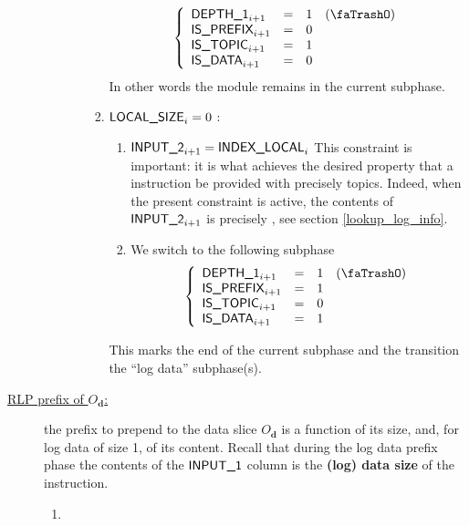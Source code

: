 \begin{description}
\begin{enumerate}[resume]
\begin{enumerate}
\begin{enumerate}
								\[
									\left\{ \begin{array}{lclr}
										\Depth 1_{i + 1}   & = & 1 & (\trash) \\
										\isprefix_{i + 1}  & = & 0 &          \\
										\isOt_{i + 1}      & = & 1 &          \\
										\isOd_{i + 1}      & = & 0 &          \\
									\end{array} \right.
								\]
								\saNote{} In other words the module remains in the current subphase. 
							\item \If $\textsf{LOCAL\_SIZE}_{i}=0$ \Then:
								\begin{enumerate}
									\item $\textsf{INPUT\_2}_{i+1} = \textsf{INDEX\_LOCAL}_{i}$
										\saNote{} This constraint is important: it is what achieves the desired property that a  instruction be provided with precisely  topics. Indeed, when the present constraint is active, the contents of $\textsf{INPUT\_2}_{i + 1}$ is precisely , see section \ref{lookup_log_info}.
									\item We switch to the following subphase
										\[
											\left\{ \begin{array}{lclr}
												\Depth 1_{i + 1}   & = & 1 & (\trash) \\
												\isprefix_{i + 1}  & = & 1 &          \\
												\isOt_{i + 1}      & = & 0 &          \\
												\isOd_{i + 1}      & = & 1 &          \\
											\end{array} \right.
										\]
								\end{enumerate}
								\saNote{} This marks the end of the current subphase and the transition the ``log data'' subphase(s).
						\end{enumerate}
				\end{enumerate}
		\end{enumerate}
	\item[\underline{RLP prefix of $O_{\mathbf{d}}$:}] the prefix to prepend to the data slice $O_{\mathbf{d}}$ is a function of its size, and, for log data of size 1, of its content. Recall that during the log data prefix phase the contents of the $\textsf{INPUT\_1}$ column is the \textbf{(log) data size} of the instruction. 
		\begin{enumerate}[resume]
			\item \If %

\end{enumerate}
\end{description}
